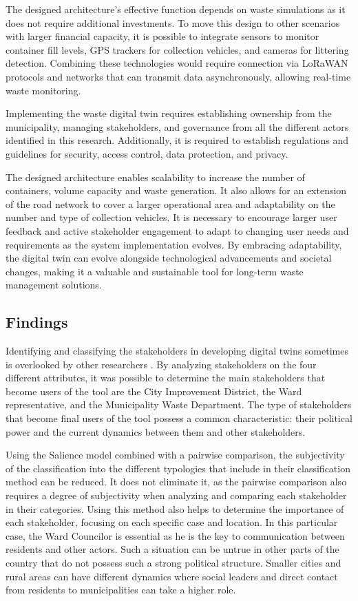 \documentclass[authoryear,preprint,review,12pt]{elsarticle}
\begin{document}
    The designed architecture's effective function depends on waste simulations as it does not require additional investments. To move this design to other scenarios with larger financial capacity, it is possible to integrate sensors to monitor container fill levels, GPS trackers for collection vehicles, and cameras for littering detection. Combining these technologies would require connection via LoRaWAN protocols and networks that can transmit data asynchronously, allowing real-time waste monitoring.

    Implementing the waste digital twin requires establishing ownership from the municipality, managing stakeholders, and governance from all the different actors identified in this research. Additionally, it is required to establish regulations and guidelines for security, access control, data protection, and privacy.

    The designed architecture enables scalability to increase the number of containers, volume capacity and waste generation. It also allows for an extension of the road network to cover a larger operational area and adaptability on the number and type of collection vehicles. It is necessary to encourage larger user feedback and active stakeholder engagement to adapt to changing user needs and requirements as the system implementation evolves. By embracing adaptability, the digital twin can evolve alongside technological advancements and societal changes, making it a valuable and sustainable tool for long-term waste management solutions.

    \subsection{Findings}\label{subsec:Findings}
    Identifying and classifying the stakeholders in developing digital twins sometimes is overlooked by other researchers \citep{Bartos2021, Jiang2022, Xu2022, Yu2023}. By analyzing stakeholders on the four different attributes, it was possible to determine the main stakeholders that become users of the tool are the City Improvement District, the Ward representative, and the Municipality Waste Department. The type of stakeholders that become final users of the tool possess a common characteristic: their political power and the current dynamics between them and other stakeholders.

    Using the Salience model combined with a pairwise comparison, the subjectivity of the classification into the different typologies that \citet{Mitchell1997, Shafique2022} include in their classification method can be reduced. It does not eliminate it, as the pairwise comparison also requires a degree of subjectivity when analyzing and comparing each stakeholder in their categories. Using this method also helps to determine the importance of each stakeholder, focusing on each specific case and location. In this particular case, the Ward Councilor is essential as he is the key to communication between residents and other actors. Such a situation can be untrue in other parts of the country that do not possess such a strong political structure. Smaller cities and rural areas can have different dynamics where social leaders and direct contact from residents to municipalities can take a higher role.
\end{document}
